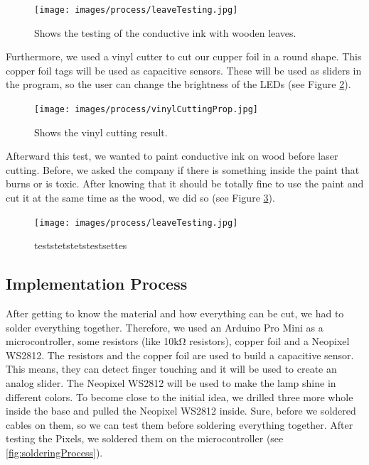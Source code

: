 \documentclass[doc.tex]{subfiles}
\begin{document}
        \begin{figure}[h!]
            \centering
            \texttt{[image: images/process/leaveTesting.jpg]}
            \caption{Shows the testing of the conductive ink with wooden leaves.}
            \label{fig:leaveConductiveInk}
        \end{figure}

        \noindent
        Furthermore, we used a vinyl cutter to cut our cupper foil in a round shape. This copper foil 
        tags will be used as capacitive sensors. These will be used as sliders in the program, so the 
        user can change the brightness of the LEDs (see Figure \ref{fig:vinylCuttingProp}).

        \begin{figure}[h!]
            \centering
            \texttt{[image: images/process/vinylCuttingProp.jpg]}
            \caption{Shows the vinyl cutting result.}
            \label{fig:vinylCuttingProp}
        \end{figure}

        \noindent
        Afterward this test, we wanted to paint conductive ink on wood before laser cutting. Before,
        we asked the company if there is something inside the paint that burns or is toxic. 
        After knowing that it should be totally fine to use the paint and cut it at the same time as 
        the wood, we did so (see Figure \ref{fig:leaveConductiveInk_laserCut}). 

        \begin{figure}[h!]
            \centering
            \texttt{[image: images/process/leaveTesting.jpg]}
            \caption{teststetstetstestsettes}
            \label{fig:leaveConductiveInk_laserCut}
        \end{figure}


    \subsection{Implementation Process}
        \begin{flushleft}
            After getting to know the material and how everything can be cut, we had to 
            solder everything together. Therefore, we used an Arduino Pro Mini \cite{arduinoProMini} 
            as a microcontroller, some resistors (like 10k\si{\ohm} resistors), copper foil and a Neopixel WS2812. \newline
            The resistors and the copper foil are used to build a capacitive sensor. \cite{Badger2019} 
            This means, they can detect finger touching and it will be used to create an analog slider.
            The Neopixel WS2812 will be used to make the lamp shine in different colors. \cite{Burgess2019} 
            \newline 
            \noindent
            To become close to the initial idea, we drilled three more whole inside the base and 
            pulled the Neopixel WS2812 inside. Sure, before we soldered cables on them, so we can 
            test them before soldering everything together. After testing the Pixels, we soldered 
            them on the microcontroller (see \ref{fig:solderingProcess}).
        \end{flushleft}
\end{document}

